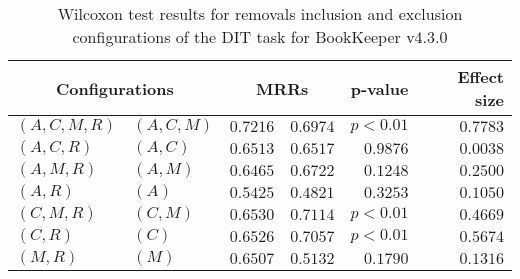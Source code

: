 
\begin{table}
\begin{spacing}{1.2}
\centering
\caption{Wilcoxon test results for removals inclusion and exclusion configurations of the DIT task for BookKeeper v4.3.0}
\label{table:versus-wilcox-bookkeeper-dit-removals}
\begin{tabular}{ll|rr|rr}
\toprule
      \multicolumn{2}{c|}{Configurations} &          \multicolumn{2}{c|}{MRRs} &       p-value & Effect size \\
\midrule
 $(A,C,M,R)$ &  $(A,C,M)$ & $0.7216$ & $0.6974$ & $p<0.01$ &    $0.7783$ \\
   $(A,C,R)$ &    $(A,C)$ & $0.6513$ & $0.6517$ & $0.9876$ &    $0.0038$ \\
   $(A,M,R)$ &    $(A,M)$ & $0.6465$ & $0.6722$ & $0.1248$ &    $0.2500$ \\
     $(A,R)$ &      $(A)$ & $0.5425$ & $0.4821$ & $0.3253$ &    $0.1050$ \\
   $(C,M,R)$ &    $(C,M)$ & $0.6530$ & $0.7114$ & $p<0.01$ &    $0.4669$ \\
     $(C,R)$ &      $(C)$ & $0.6526$ & $0.7057$ & $p<0.01$ &    $0.5674$ \\
     $(M,R)$ &      $(M)$ & $0.6507$ & $0.5132$ & $0.1790$ &    $0.1316$ \\
\bottomrule
\end{tabular}

\end{spacing}
\end{table}


